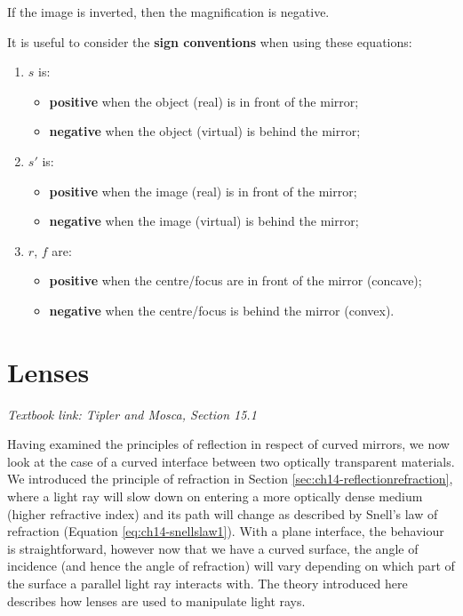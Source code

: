 \documentclass[
]{book}
\providecommand{\tightlist}{%
  \setlength{\itemsep}{0pt}\setlength{\parskip}{0pt}}
\begin{document}
If the image is inverted, then the magnification is negative.

It is useful to consider the \textbf{sign conventions} when using these equations:

\begin{enumerate}
\def\labelenumi{\arabic{enumi}.}
\tightlist
\item
  \(s\) is:

  \begin{itemize}
  \tightlist
  \item
    \textbf{positive} when the object (real) is in front of the mirror;
  \item
    \textbf{negative} when the object (virtual) is behind the mirror;
  \end{itemize}
\item
  \(s'\) is:

  \begin{itemize}
  \tightlist
  \item
    \textbf{positive} when the image (real) is in front of the mirror;
  \item
    \textbf{negative} when the image (virtual) is behind the mirror;
  \end{itemize}
\item
  \(r\), \(f\) are:

  \begin{itemize}
  \tightlist
  \item
    \textbf{positive} when the centre/focus are in front of the mirror (concave);
  \item
    \textbf{negative} when the centre/focus is behind the mirror (convex).
  \end{itemize}
\end{enumerate}

\hypertarget{sec:ch16-lenses}{%
\chapter{Lenses}\label{sec:ch16-lenses}}

\emph{Textbook link: Tipler and Mosca, Section 15.1}

Having examined the principles of reflection in respect of curved mirrors, we now look at the case of a curved interface between two optically transparent materials. We introduced the principle of refraction in Section \ref{sec:ch14-reflectionrefraction}, where a light ray will slow down on entering a more optically dense medium (higher refractive index) and its path will change as described by Snell's law of refraction (Equation \eqref{eq:ch14-snellslaw1}). With a plane interface, the behaviour is straightforward, however now that we have a curved surface, the angle of incidence (and hence the angle of refraction) will vary depending on which part of the surface a parallel light ray interacts with. The theory introduced here describes how lenses are used to manipulate light rays.
\end{document}
